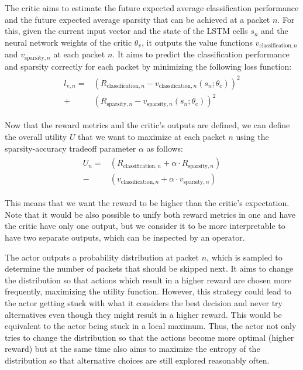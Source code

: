 \documentclass[conference]{IEEEtran}
\begin{document}
The critic aims to estimate the future expected average classification performance and the future expected average sparsity that can be achieved at a packet $n$. For this, given the current input vector and the state of the LSTM cells $s_n$ and the neural network weights of the critic $\theta_v$, it outputs the value functions $v_{\text{classification},n}$ and $v_{\text{sparsity},n}$ at each packet $n$. It aims to predict the classification performance and sparsity correctly for each packet by minimizing the following loss function:
\begin{align}
\begin{split}
l_{\text{v},n} =& \left(R_{\text{classification},n} - v_{\text{classification},n}\left(s_n ; \theta_\text{c} \right)\right)^2 \\
+ & \left(R_{\text{sparsity},n} - v_{\text{sparsity},n}\left(s_n ; \theta_\text{c} \right)\right)^2
\end{split}
\end{align}

Now that the reward metrics and the critic's outputs are defined, we can define the overall utility $U$ that we want to maximize at each packet $n$ using the sparsity-accuracy tradeoff parameter $\alpha$ as follows:
\begin{align}
\begin{split}
U_n =& \left(R_{\text{classification},n} + \alpha \cdot R_{\text{sparsity},n}\right) \\
- & \left(v_{\text{classification},n} + \alpha \cdot v_{\text{sparsity},n}\right)
\end{split}
\end{align}

This means that we want the reward to be higher than the critic's expectation. Note that it would be also possible to unify both reward metrics in one and have the critic have only one output, but we consider it to be more interpretable to have two separate outputs, which can be inspected by an operator.

The actor outputs a probability distribution at packet $n$, which is sampled to determine the number of packets that should be skipped next. It aims to change the distribution so that actions which result in a higher reward are chosen more frequently, maximizing the utility function. However, this strategy could lead to the actor getting stuck with what it considers the best decision and never try alternatives even though they might result in a higher reward. This would be equivalent to the actor being stuck in a local maximum. Thus, the actor not only tries to change the distribution so that the actions become more optimal (higher reward) but at the same time also aims to maximize the entropy of the distribution so that alternative choices are still explored reasonably often.
\end{document}
